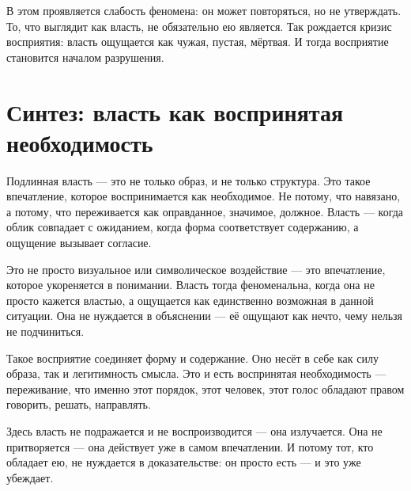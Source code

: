 В этом проявляется слабость феномена: он может повторяться, но не утверждать. То, что выглядит как власть, не обязательно ею является. Так рождается кризис восприятия: власть ощущается как чужая, пустая, мёртвая. И тогда восприятие становится началом разрушения.

\section{Синтез: власть как воспринятая необходимость}

Подлинная власть — это не только образ, и не только структура. Это такое впечатление, которое воспринимается как необходимое. Не потому, что навязано, а потому, что переживается как оправданное, значимое, должное. Власть — когда облик совпадает с ожиданием, когда форма соответствует содержанию, а ощущение вызывает согласие.

Это не просто визуальное или символическое воздействие — это впечатление, которое укореняется в понимании. Власть тогда феноменальна, когда она не просто кажется властью, а ощущается как единственно возможная в данной ситуации. Она не нуждается в объяснении — её ощущают как нечто, чему нельзя не подчиниться.

Такое восприятие соединяет форму и содержание. Оно несёт в себе как силу образа, так и легитимность смысла. Это и есть воспринятая необходимость — переживание, что именно этот порядок, этот человек, этот голос обладают правом говорить, решать, направлять.

Здесь власть не подражается и не воспроизводится — она излучается. Она не притворяется — она действует уже в самом впечатлении. И потому тот, кто обладает ею, не нуждается в доказательстве: он просто есть — и это уже убеждает.
